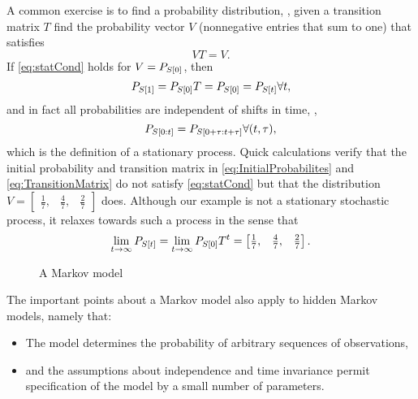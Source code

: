A common exercise is to find a \emph{} probability
distribution, \ie, given a transition matrix $T$ find the probability
vector $V$ (nonnegative entries that sum to one) that satisfies
\begin{equation}
  \label{eq:statCond}
  VT = V.  
\end{equation}
If \eqref{eq:statCond} holds for $V = P_{{S}{[0]}}$, then
\begin{equation*}
  P_{{S}{[1]}}  = P_{{S}{[0]}}T = P_{{S}{[0]}} = P_{{S}{[t]}}
  \forall t,
\end{equation*}
and in fact all probabilities are independent of shifts in time, \ie,
\begin{equation*}
  P_{S[0:t]} = P_{S[0+\tau:t+\tau]} \forall (t,\tau),
\end{equation*}
which is the definition of a stationary process.  Quick calculations
verify that the initial probability and transition matrix in
\eqref{eq:InitialProbabilites} and \eqref{eq:TransitionMatrix} do not
satisfy \eqref{eq:statCond} but that the distribution $V =
\begin{bmatrix} \frac{1}{7}, & \frac{4}{7}, & \frac{2}{7}
\end{bmatrix}$ does.  Although our example is not a stationary
stochastic process, it relaxes towards such a process in the sense
that
\begin{equation*}
  \lim_{t \rightarrow \infty} P_{{S}{[t]}} =  \lim_{t \rightarrow
    \infty} P_{{S}{[0]}} T^t = \begin{bmatrix} \frac{1}{7}, & \frac{4}{7}, & \frac{2}{7}
\end{bmatrix}.
\end{equation*}

\begin{figure}[htbp]
  \centering{\plotsize%
    }
  \caption[A Markov model.]{A Markov model}
  \label{fig:mm}
\end{figure}

The important points about a Markov model also apply to hidden
Markov models, namely that:
\begin{itemize}
\item The model determines the probability of arbitrary sequences of
  observations,
\item and the assumptions about independence and time invariance
  permit specification of the model by a small number of parameters.
\end{itemize}

